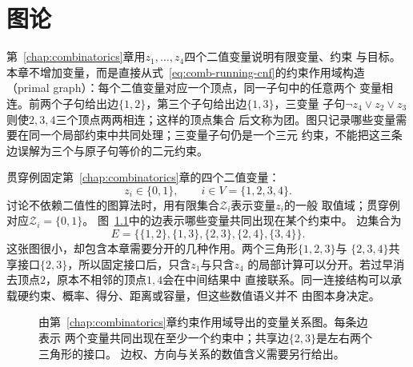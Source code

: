 \chapter{图论}
\label{chap:graph-theory}
第~\ref{chap:combinatorics}章用\(z_1,\ldots,z_4\)四个二值变量说明有限变量、约束
与目标。本章不增加变量，而是直接从式~\eqref{eq:comb-running-cnf}的约束作用域构造
（primal graph）：每个二值变量对应一个顶点，同一子句中的任意两个
变量相连。前两个子句给出边\(\{1,2\}\)，第三个子句给出边\(\{1,3\}\)，三变量
子句\(\neg z_4\lor z_2\lor z_3\)则使\(2,3,4\)三个顶点两两相连；这样的顶点集合
后文称为团。图只记录哪些变量需要在同一个局部约束中共同处理；三变量子句仍是一个三元
约束，不能把这三条边误解为三个与原子句等价的二元约束。

贯穿例固定第~\ref{chap:combinatorics}章的四个二值变量：
\[
  z_i\in\{0,1\},\qquad i\in V=\{1,2,3,4\}.
\]
讨论不依赖二值性的图算法时，用有限集合\(\mathcal{Z}_i\)表示变量\(z_i\)的一般
取值域；贯穿例对应\(\mathcal{Z}_i=\{0,1\}\)。
图~\ref{fig:graph-theory-running-graph}中的边表示哪些变量共同出现在某个约束中。
边集合为
\begin{equation}
  E=\bigl\{\{1,2\},\{1,3\},\{2,3\},\{2,4\},\{3,4\}\bigr\}.
  \label{eq:graph-theory-running-edges}
\end{equation}
这张图很小，却包含本章需要分开的几种作用。两个三角形\(\{1,2,3\}\)与
\(\{2,3,4\}\)共享接口\(\{2,3\}\)，所以固定接口后，只含\(z_1\)与只含\(z_4\)
的局部计算可以分开。若过早消去顶点\(2\)，原本不相邻的顶点\(1,4\)会在中间结果中
直接联系。同一连接结构可以承载硬约束、概率、得分、距离或容量，但这些数值语义并不
由图本身决定。

\begin{figure}[htbp]
  \centering
  \caption{由第~\ref{chap:combinatorics}章约束作用域导出的变量关系图。每条边表示
  两个变量共同出现在至少一个约束中；共享边\(\{2,3\}\)是左右两个三角形的接口。
  边权、方向与关系的数值含义需要另行给出。}
  \label{fig:graph-theory-running-graph}
\end{figure}

